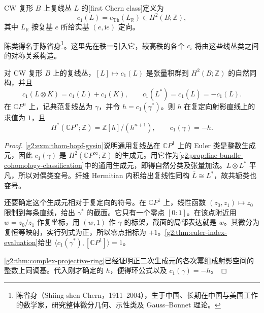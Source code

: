 \begin{definition}\label{g2:def:first-chern-line}
	CW 复形 \(B\) 上复线丛 \(L\) 的[first Chern class]定义为
	\begin{equation}\label{g2:eq:first-chern-euler}
		c_1(L)=e_{\mathrm{Th}}(L_{\mathbb R})\in H^2(B;\mathbb Z),
	\end{equation}
	其中 \(L_{\mathbb R}\) 按复基 \(e\) 所给实基 \((e,\mathrm i e)\) 定向。
\end{definition}

陈类得名于陈省身\footnote{陈省身（Shiing-shen Chern，1911--2004），生于中国、长期在中国与美国工作的数学家，研究整体微分几何、示性类及 Gauss--Bonnet 理论。}。这里先在秩一引入它，较高秩的各个 \(c_i\) 将由这些线丛类之间的对称关系构造。

\begin{proposition}\label{g2:prop:line-characteristic-classes}
	对 CW 复形 \(B\) 上的复线丛，\([L]\mapsto c_1(L)\) 是张量积群到 \(H^2(B;\mathbb Z)\) 的自然同构，并且
	\begin{equation}\label{g2:eq:line-chern-operations}
		c_1(L\otimes K)=c_1(L)+c_1(K),\qquad
		c_1(L^*)=c_1(\overline L)=-c_1(L).
	\end{equation}
	在 \(\mathbb CP^n\) 上，记典范复线丛为 \(\gamma\)，并令 \(h=c_1(\gamma^*)\)。则 \(h\) 在复定向射影直线上的求值为 \(1\)，且
	\[
		H^*(\mathbb CP^n;\mathbb Z)=\mathbb Z[h]/(h^{n+1}),\qquad c_1(\gamma)=-h.
	\]
\end{proposition}
\begin{proof}
	\cref{g2:exm:thom-hopf-gysin}说明通用复线丛在 \(\mathbb CP^1\) 上的 Euler 类是整数生成元，因此 \(c_1(\gamma)\) 是 \(H^2(\mathbb CP^\infty;\mathbb Z)\) 的生成元。用它作为\cref{g2:prop:line-bundle-cohomology-classification}中的通用生成元，即得自然分类及张量加法。\(L\otimes L^*\) 平凡，所以对偶类变号。纤维 Hermitian 内积给出复线性同构 \(\overline L\cong L^*\)，故共轭类也变号。

	还要确定这个生成元相对于复定向的符号。在 \(\mathbb CP^1\) 上，线性函数 \((z_0,z_1)\mapsto z_0\) 限制到每条直线，给出 \(\gamma^*\) 的截面。它只有一个零点 \([0:1]\)。在该点附近用 \(w=z_0/z_1\) 作复坐标，用 \((w,1)\) 作 \(\gamma\) 的标架，截面的局部表达就是 \(w\)。其微分为复恒等映射，实行列式为正，所以零点指标为 \(+1\)。\cref{g2:thm:euler-index-evaluation}给出 \(\langle c_1(\gamma^*),[\mathbb CP^1]\rangle=1\)。

	\cref{g2:thm:complex-projective-ring}已经证明正二次生成元的各次幂组成射影空间的整数上同调基。代入刚才确定的 \(h\)，便得环公式以及 \(c_1(\gamma)=-h\)。
\end{proof}

